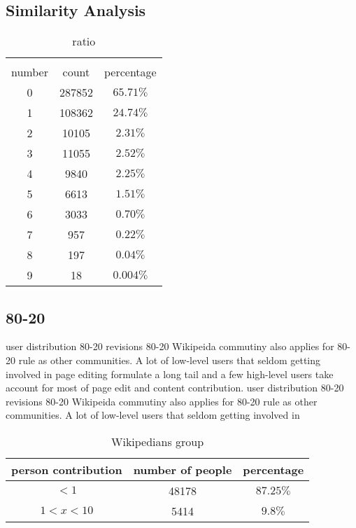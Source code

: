 \documentclass{elsarticle}
\begin{document}
\subsection{Similarity Analysis}
\label{sec:similarity-analysis}

\begin{table}
    \centering
    \caption{ratio}
    \begin{tabular}[center]{|c|c|c|}
      \hline\\
      number & count & percentage \\\hline
      0 & 287852& $65.71\%$\\\hline
      1 & 108362& $24.74\%$\\\hline
      2 & 10105& $2.31\%$\\\hline
      3 & 11055& $2.52\%$\\\hline
      4 & 9840&$2.25\%$ \\\hline
      5 & 6613& $1.51\%$\\\hline
      6 & 3033& $0.70\%$\\\hline
      7 & 957& $0.22\%$\\\hline
      8 & 197& $0.04\%$\\\hline
      9 & 18& $0.004\%$\\\hline
     
    \end{tabular}
   
 \end{table}
  
\subsection{80-20}
\label{sec:80-20}
user distribution 80-20
revisions 80-20
Wikipeida commutiny also applies for 80-20 rule as other
communities. A lot of low-level users that seldom getting involved in
page editing formulate a long tail and a few high-level users take
account for most of page edit and content contribution.
\label{sec:80-20}
user distribution 80-20
revisions 80-20
Wikipeida commutiny also applies for 80-20 rule as other
communities. A lot of low-level users that seldom getting involved in
\begin{table}[h]
  \centering
  \caption{Wikipedians group}
  \begin{tabular}[center]{|c|c|c|}
    \hline
    person contribution&number of people&percentage
    \\\hline
    $< 1$&48178&$87.25\%$\\\hline
    $1<x<10$&5414&$9.8\%$\\\hline
  \end{tabular}

\end{table}
\end{document}
